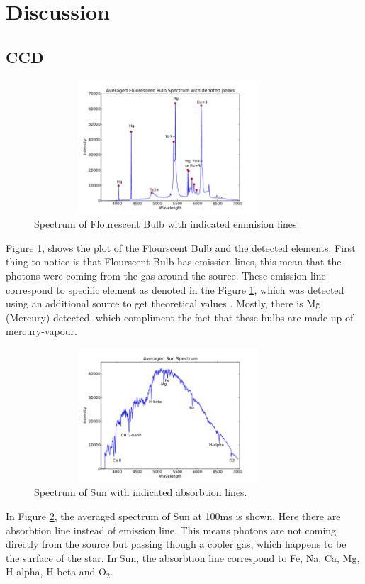 \documentclass[a4paper,12pt]{article}
\begin{document}
\section{Discussion}
\label{sec:discuss}

\subsection{CCD} 
\label{sec:ccd}
\begin{figure}[H]
\centering
\includegraphics[angle=0,height=5cm,width=10cm]{graphs/FluoLampPeak.pdf}
\caption{Spectrum of Flourescent Bulb with indicated emmision lines.}
\label{fig:bulb}
\end{figure}
Figure \ref{fig:bulb}, shows the plot of the Flourscent Bulb and the detected elements. First thing to notice is that Flourscent Bulb has emission lines, this mean that the photons were coming from the gas around the source. These emission line correspond to specific element as denoted in the Figure \ref{fig:bulb}, which was detected using an additional source to get theoretical values \cite{theo}. Mostly, there is Mg (Mercury) detected, which compliment the fact that these bulbs are made up of mercury-vapour. 
\begin{figure}[H]
\centering
\includegraphics[angle=0,height=5cm,width=10cm]{graphs/Sun.pdf}
\caption{Spectrum of Sun with indicated absorbtion lines.}
\label{fig:sun}
\end{figure}
In Figure \ref{fig:sun}, the averaged spectrum of Sun at 100ms is shown. Here there are absorbtion line instead of emission line. This means photons are not coming directly from the source but passing though a cooler gas, which happens to be the surface of the star. In Sun, the absorbtion line correspond to Fe, Na, Ca, Mg, H-alpha, H-beta and O$_2$.
\end{document}
